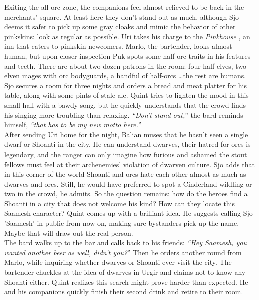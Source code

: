 Exiting the all-orc zone, the companions feel almost relieved to be back in the merchants' square. At least here they don't stand out as much, although Sjo deems it safer to pick up some gray cloaks and mimic the behavior of other pinkskins: look as regular as possible. Uri takes his charge to the {\itshape Pinkhouse} , an inn that caters to pinkskin newcomers. Marlo, the bartender, looks almost human, but upon closer inspection Puk spots some half-orc traits in his features and teeth. There are about two dozen patrons in the room: four half-elves, two elven mages with orc bodyguards, a handful of half-orcs \ldots the rest are humans. Sjo secures a room for three nights and orders a bread and meat platter for his table, along with some pints of stale ale. Quint tries to lighten the mood in this small hall with a bawdy song, but he quickly understands that the crowd finds his singing more troubling than relaxing. {\itshape``Don't stand out,}'' the bard reminds himself, {\itshape``that has to be my new motto here.}''\\

After sending Uri home for the night, Balian muses that he hasn't seen a single dwarf or Shoanti in the city. He can understand dwarves, their hatred for orcs is legendary, and the ranger can only imagine how furious and ashamed the stout fellows must feel at their archenemies' violation of dwarven culture. Sjo adds that in this corner of the world Shoanti and orcs hate each other almost as much as dwarves and orcs. Still, he would have preferred to spot a Cinderland wildling or two in the crowd, he admits. So the question remains: how do the heroes find a Shoanti in a city that does not welcome his kind? How can they locate this Saamesh character? Quint comes up with a brilliant idea. He suggests calling Sjo 'Saamesh' in public from now on, making sure bystanders pick up the name. Maybe that will draw out the real person.\\

The bard walks up to the bar and calls back to his friends: {\itshape``Hey Saamesh, you wanted another beer as well, didn't you?}'' Then he orders another round from Marlo, while inquiring whether dwarves or Shoanti ever visit the city. The bartender chuckles at the idea of dwarves in Urgir and claims not to know any Shoanti either. Quint realizes this search might prove harder than expected. He and his companions quickly finish their second drink and retire to their room.\\


